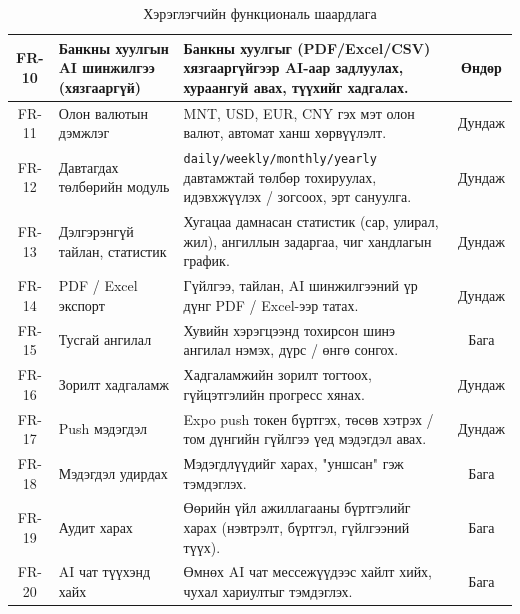 \begin{table}[ht]
\begin{tabular}{|c|p{3.7cm}|p{7cm}|c|}
FR-10 & Банкны хуулгын AI шинжилгээ (хязгааргүй) & Банкны хуулгыг (PDF/Excel/CSV) хязгааргүйгээр AI-аар задлуулах, хураангуй авах, түүхийг хадгалах. & Өндөр \\ \hline
FR-11 & Олон валютын дэмжлэг         & MNT, USD, EUR, CNY гэх мэт олон валют, автомат ханш хөрвүүлэлт. & Дундаж \\ \hline
FR-12 & Давтагдах төлбөрийн модуль  & \texttt{daily/weekly/monthly/yearly} давтамжтай төлбөр тохируулах, идэвхжүүлэх / зогсоох, эрт сануулга. & Дундаж \\ \hline
FR-13 & Дэлгэрэнгүй тайлан, статистик & Хугацаа дамнасан статистик (сар, улирал, жил), ангиллын задаргаа, чиг хандлагын график. & Дундаж \\ \hline
FR-14 & PDF / Excel экспорт          & Гүйлгээ, тайлан, AI шинжилгээний үр дүнг PDF / Excel-ээр татах. & Дундаж \\ \hline
FR-15 & Тусгай ангилал               & Хувийн хэрэгцээнд тохирсон шинэ ангилал нэмэх, дүрс / өнгө сонгох. & Бага \\ \hline
FR-16 & Зорилт хадгаламж             & Хадгаламжийн зорилт тогтоох, гүйцэтгэлийн прогресс хянах. & Дундаж \\ \hline
FR-17 & Push мэдэгдэл                & Expo push токен бүртгэх, төсөв хэтрэх / том дүнгийн гүйлгээ үед мэдэгдэл авах. & Дундаж \\ \hline
FR-18 & Мэдэгдэл удирдах             & Мэдэгдлүүдийг харах, "уншсан" гэж тэмдэглэх. & Бага \\ \hline
FR-19 & Аудит харах                  & Өөрийн үйл ажиллагааны бүртгэлийг харах (нэвтрэлт, бүртгэл, гүйлгээний түүх). & Бага \\ \hline
FR-20 & AI чат түүхэнд хайх          & Өмнөх AI чат мессежүүдээс хайлт хийх, чухал хариултыг тэмдэглэх. & Бага \\ \hline
\end{tabular}
\caption{Хэрэглэгчийн функциональ шаардлага}
\label{tab:fr-user}
\end{table}

